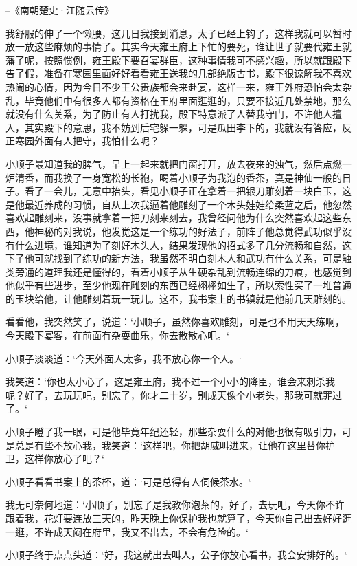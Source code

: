 --《南朝楚史·江随云传》

我舒服的伸了一个懒腰，这几日我接到消息，太子已经上钩了，这样我就可以暂时放一放这些麻烦的事情了。其实今天雍王府上下忙的要死，谁让世子就要代雍王就藩了呢，按照惯例，雍王殿下要召宴群臣，这种事情我可不感兴趣，所以就跟殿下告了假，准备在寒园里面好好看看雍王送我的几部绝版古书，殿下很谅解我不喜欢热闹的心情，因为今日不少王公贵族都会来赴宴，这样一来，雍王外府恐怕会太杂乱，毕竟他们中有很多人都有资格在王府里面逛逛的，只要不接近几处禁地，那么就没有什么关系，为了防止有人打扰我，殿下特意派了人替我守门，不许他人擅入，其实殿下的意思，我不妨到后宅躲一躲，可是瓜田李下的，我就没有答应，反正寒园外面有人把守，我怕什么呢？

小顺子最知道我的脾气，早上一起来就把门窗打开，放去夜来的浊气，然后点燃一炉清香，而我换了一身宽松的长袍，喝着小顺子为我泡的香茶，真是神仙一般的日子。看了一会儿，无意中抬头，看见小顺子正在拿着一把银刀雕刻着一块白玉，这是他最近养成的习惯，自从上次我逼着他雕刻了一个木头娃娃给柔蓝之后，他忽然喜欢起雕刻来，没事就拿着一把刀刻来刻去，我曾经问他为什么突然喜欢起这些东西，他神秘的对我说，他发觉这是一个练功的好法子，前阵子他总觉得武功似乎没有什么进境，谁知道为了刻好木头人，结果发现他的招式多了几分流畅和自然，这下子他可就找到了练功的新方法，我虽然不明白刻木人和武功有什么关系，可是触类旁通的道理我还是懂得的，看着小顺子从生硬杂乱到流畅连绵的刀痕，也感觉到他似乎有些进步，至少他现在雕刻的东西已经栩栩如生了，所以索性买了一堆普通的玉块给他，让他雕刻着玩一玩儿。这不，我书案上的书镇就是他前几天雕刻的。

看看他，我突然笑了，说道：‘小顺子，虽然你喜欢雕刻，可是也不用天天练啊，今天殿下宴客，在前面有杂耍曲乐，你去散散心吧。‘

小顺子淡淡道：‘今天外面人太多，我不放心你一个人。‘

我笑道：‘你也太小心了，这是雍王府，我不过一个小小的降臣，谁会来刺杀我呢？好了，去玩玩吧，别忘了，你才二十岁，别成天像个小老头，那我可就罪过了。‘

小顺子瞪了我一眼，可是他毕竟年纪还轻，那些杂耍什么的对他也很有吸引力，可是总是有些不放心我，我笑道：‘这样吧，你把胡威叫进来，让他在这里替你护卫，这样你放心了吧？‘

小顺子看看书案上的茶杯，道：‘可是总得有人伺候茶水。‘

我无可奈何地道：‘小顺子，别忘了是我教你泡茶的，好了，去玩吧，今天你不许跟着我，花灯要连放三天的，昨天晚上你保护我也就算了，今天你自己出去好好逛一逛，不许成天闷在府里，我又不出去，不会有危险的。‘

小顺子终于点点头道：‘好，我这就出去叫人，公子你放心看书，我会安排好的。‘

